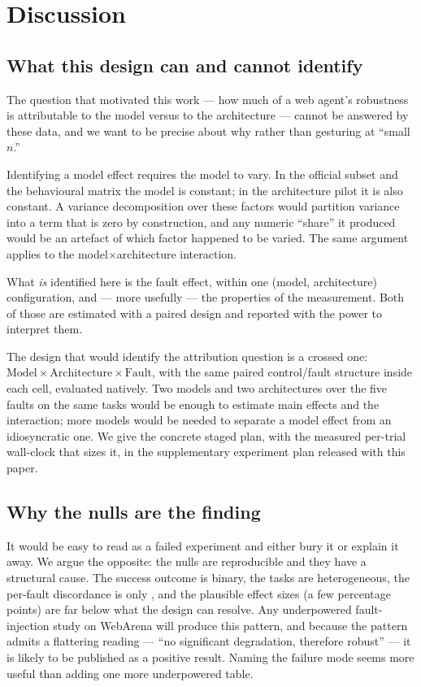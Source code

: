 \section{Discussion}
\label{sec:discussion}

\subsection{What this design can and cannot identify}
\label{sec:identifiability}

The question that motivated this work --- how much of a web agent's robustness is
attributable to the model versus to the architecture --- cannot be answered by
these data, and we want to be precise about why rather than gesturing at
``small $n$.''

Identifying a model effect requires the model to vary. In the official subset and
the behavioural matrix the model is constant; in the architecture pilot it is also
constant. A variance decomposition over these factors would partition variance
into a term that is zero by construction, and any numeric ``share'' it produced
would be an artefact of which factor happened to be varied. The same argument
applies to the model$\times$architecture interaction.

What \emph{is} identified here is the fault effect, within one
(model, architecture) configuration, and --- more usefully --- the properties of
the measurement. Both of those are estimated with a paired design and reported
with the power to interpret them.

The design that would identify the attribution question is a crossed one:
$\mathrm{Model} \times \mathrm{Architecture} \times \mathrm{Fault}$, with the same
paired control/fault structure inside each cell, evaluated natively. Two models
and two architectures over the five faults on the same \OfficialTasks{} tasks
would be enough to estimate main effects and the interaction; more models would be
needed to separate a model effect from an idiosyncratic one. We give the concrete
staged plan, with the measured per-trial wall-clock that sizes it, in the
supplementary experiment plan released with this paper.

\subsection{Why the nulls are the finding}

It would be easy to read  as a failed experiment and either
bury it or explain it away. We argue the opposite: the nulls are reproducible and
they have a structural cause. The success outcome is binary, the tasks are
heterogeneous, the per-fault discordance is only \PiDNative{}, and the plausible
effect sizes (a few percentage points) are far below what the design can resolve.
Any underpowered fault-injection study on WebArena will produce this pattern, and
because the pattern admits a flattering reading --- ``no significant degradation,
therefore robust'' --- it is likely to be published as a positive result. Naming
the failure mode seems more useful than adding one more underpowered table.

